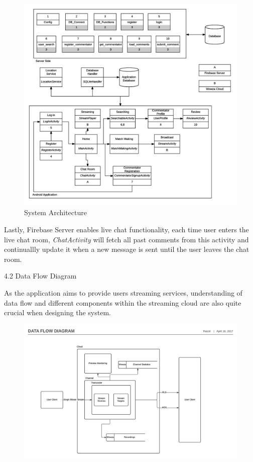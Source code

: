 \documentclass{article}
\begin{document}
\begin{flushleft}
\begin{figure}[H]
	\centering
	\includegraphics[width=13.5cm]{system-architecture}
	\caption{System Architecture}
	\label{fig:system-architecture}
\end{figure}
Lastly, Firebase Server enables live chat functionality, each time user enters the live chat room, \textit{ChatActivity} will fetch all past comments from this activity and continuallly update it when a new message is sent until the user leaves the chat room.\par
{\Large 4.2 Data Flow Diagram}\par
As the application aims to provide users streaming services, understanding of data flow and different components within the streaming cloud are also quite crucial when designing the system.\par
\begin{figure}[H]
	\centering
	\includegraphics[width=14cm]{data-flow-diagram}

\end{figure}
\end{flushleft}
\end{document}
